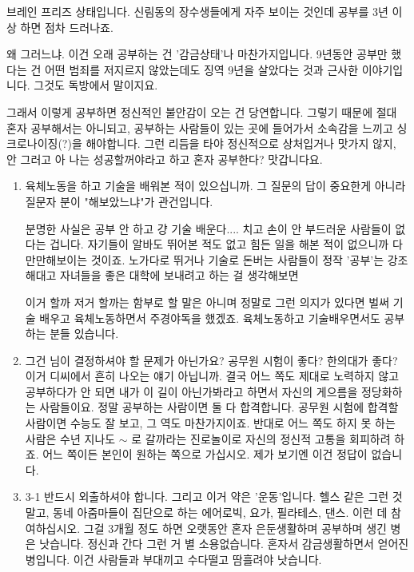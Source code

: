 브레인 프리즈 상태입니다.
신림동의 장수생들에게 자주 보이는 것인데
공부를 3년 이상 하면 점차 드러나죠.
\vspace{5mm}

왜 그러느냐. 이건 오래 공부하는 건 '감금상태'나 마찬가지입니다.
9년동안 공부만 했다는 건 어떤 범죄를 저지르지 않았는데도 징역 9년을 살았다는 것과 근사한 이야기입니다.
그것도 독방에서 말이지요.
\vspace{5mm}

그래서 이렇게 공부하면 정신적인 불안감이 오는 건 당연합니다.
그렇기 때문에 절대 혼자 공부해서는 아니되고, 공부하는 사람들이 있는 곳에 들어가서 소속감을 느끼고 싱크로나이징(?)을 해야합니다.
그런 리듬을 타야 정신적으로 상처입거나 맛가지 않지, 안 그러고 아 나는 성공할꺼야라고 하고 혼자 공부한다?
맛갑니다요.
\vspace{5mm}
\begin{enumerate}
    \item 육체노동을 하고 기술을 배워본 적이 있으십니까.
    그 질문의 답이 중요한게 아니라 질문자 분이 "해보았느냐"가 관건입니다.
    \vspace{5mm}
    
    분명한 사실은 공부 안 하고 걍 기술 배운다.... 치고 손이 안 부드러운 사람들이 없다는 겁니다.
    자기들이 알바도 뛰어본 적도 없고 힘든 일을 해본 적이 없으니까 다 만만해보이는 것이죠.
    노가다로 뛰거나 기술로 돈버는 사람들이 정작 '공부'는 강조해대고 자녀들을 좋은 대학에 보내려고 하는 걸 생각해보면
    \vspace{5mm}
    
    이거 할까 저거 할까는 함부로 할 말은 아니며
    정말로 그런 의지가 있다면 벌써 기술 배우고 육체노동하면서 주경야독을 했겠죠.
    육체노동하고 기술배우면서도 공부하는 분들 있습니다.
    \vspace{5mm}
    
    \item 그건 님이 결정하셔야 할 문제가 아닌가요?
    공무원 시험이 좋다? 한의대가 좋다? 이거 디씨에서 흔히 나오는 얘기 아닙니까.
    결국 어느 쪽도 제대로 노력하지 않고 공부하다가 안 되면 내가 이 길이 아닌가봐라고 하면서 자신의 게으름을 정당화하는 사람들이요.
    정말 공부하는 사람이면 둘 다 합격합니다. 공무원 시험에 합격할 사람이면 수능도 잘 보고, 그 역도 마찬가지이죠.
    반대로 어느 쪽도 하지 못 하는 사람은 수년 지나도 $\sim$ 로 갈까라는 진로놀이로 자신의 정신적 고통을 회피하려 하죠.
    어느 쪽이든 본인이 원하는 쪽으로 가십시오. 제가 보기엔 이건 정답이 없습니다.
    \vspace{5mm}
    
    \item 3-1 반드시 외출하셔야 합니다. 그리고 이거 약은 '운동'입니다.
    헬스 같은 그런 것 말고, 동네 아줌마들이 집단으로 하는 에어로빅, 요가, 필라테스, 댄스. 이런 데 참여하십시오.
    그걸 3개월 정도 하면 오랫동안 혼자 은둔생활하며 공부하며 생긴 병은 낫습니다.
    정신과 간다 그런 거 별 소용없습니다. 혼자서 감금생활하면서 얻어진 병입니다. 이건 사람들과 부대끼고 수다떨고 땀흘려야 낫습니다.
    \vspace{5mm}
    

\end{enumerate}
